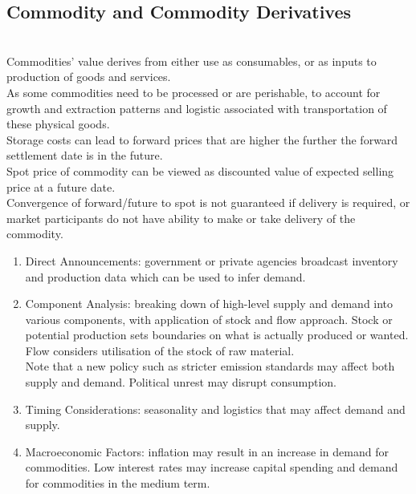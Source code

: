 \subsection{Commodity and Commodity Derivatives}

\begin{remark} \\
Commodities' value derives from either use as consumables, or as inputs to production of goods and services.\\
As some commodities need to be processed or are perishable, to account for growth and extraction patterns and logistic associated with transportation of these physical goods.\\
Storage costs can lead to forward prices that are higher the further the forward settlement date is in the future.\\
Spot price of commodity can be viewed as discounted value of expected selling price at a future date.\\
Convergence of forward/future to spot is not guaranteed if delivery is required, or market participants do not have ability to make or take delivery of the commodity.
\end{remark}

\begin{remark} 
\begin{enumerate}[label=\roman*.]
\setlength{\itemsep}{0pt}
\item Direct Announcements: government or private agencies broadcast inventory and production data which can be used to infer demand.
\item Component Analysis: breaking down of high-level supply and demand into various components, with application of stock and flow approach. Stock or potential production sets boundaries on what is actually produced or wanted. Flow considers utilisation of the stock of raw material.\\
Note that a new policy such as stricter emission standards may affect both supply and demand. Political unrest may disrupt consumption.
\item Timing Considerations: seasonality and logistics that may affect demand and supply. 
\item Macroeconomic Factors: inflation may result in an increase in demand for commodities. Low interest rates may increase capital spending and demand for commodities in the medium term.
\end{enumerate}
\end{remark}

